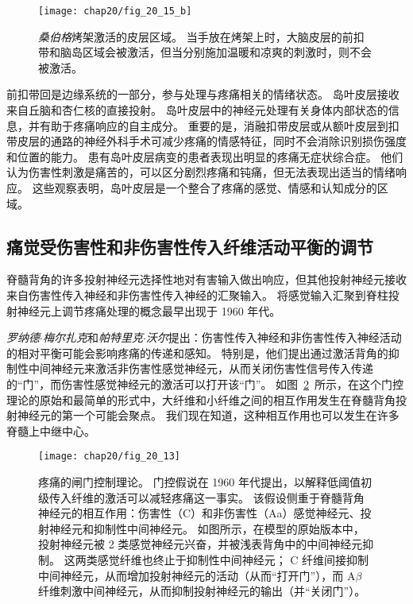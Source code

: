 \begin{figure}[htbp]
	\centering
	\texttt{[image: chap20/fig\_20\_15\_b]}
	\caption{\textit{桑伯格}烤架激活的皮层区域。
		当手放在烤架上时，大脑皮层的前扣带和脑岛区域会被激活，但当分别施加温暖和凉爽的刺激时，则不会被激活。}
	\label{fig:20_15_b}
\end{figure}


前扣带回是边缘系统的一部分，参与处理与疼痛相关的情绪状态。
岛叶皮层接收来自丘脑和杏仁核的直接投射。
岛叶皮层中的神经元处理有关身体内部状态的信息，并有助于疼痛响应的自主成分。
重要的是，消融扣带皮层或从额叶皮层到扣带皮层的通路的神经外科手术可减少疼痛的情感特征，同时不会消除识别损伤强度和位置的能力。
患有岛叶皮层病变的患者表现出明显的疼痛无症状综合症。
他们认为伤害性刺激是痛苦的，可以区分剧烈疼痛和钝痛，但无法表现出适当的情绪响应。
这些观察表明，岛叶皮层是一个整合了疼痛的感觉、情感和认知成分的区域。



\subsection{痛觉受伤害性和非伤害性传入纤维活动平衡的调节}

脊髓背角的许多投射神经元选择性地对有害输入做出响应，但其他投射神经元接收来自伤害性传入神经和非伤害性传入神经的汇聚输入。
将感觉输入汇聚到脊柱投射神经元上调节疼痛处理的概念最早出现于 1960 年代。


\textit{罗纳德$\cdot$梅尔扎克}和\textit{帕特里克$\cdot$沃尔}提出：伤害性传入神经和非伤害性传入神经活动的相对平衡可能会影响疼痛的传递和感知\cite{melzack1965pain}。
特别是，他们提出通过激活背角的抑制性中间神经元来激活非伤害性感觉神经元，从而关闭伤害性信号传入传递的“门”，而伤害性感觉神经元的激活可以打开该“门”。 
如图~\ref{fig:20_16}~所示，在这个门控理论的原始和最简单的形式中，大纤维和小纤维之间的相互作用发生在脊髓背角投射神经元的第一个可能会聚点。
我们现在知道，这种相互作用也可以发生在许多脊髓上中继中心。


\begin{figure}[htbp]
	\centering
	\texttt{[image: chap20/fig\_20\_13]}
	\caption{疼痛的闸门控制理论。
		门控假说在 1960 年代提出，以解释低阈值初级传入纤维的激活可以减轻疼痛这一事实。
		该假设侧重于脊髓背角神经元的相互作用：伤害性（C）和非伤害性（Aa）感觉神经元、投射神经元和抑制性中间神经元。
		如图所示，在模型的原始版本中，投射神经元被 2 类感觉神经元兴奋，并被浅表背角中的中间神经元抑制。
		这两类感觉纤维也终止于抑制性中间神经元；
		C 纤维间接抑制中间神经元，从而增加投射神经元的活动（从而“打开门”），而 A$ \beta $ 纤维刺激中间神经元，从而抑制投射神经元的输出（并“关闭门”）。}
	\label{fig:20_16}
\end{figure}


